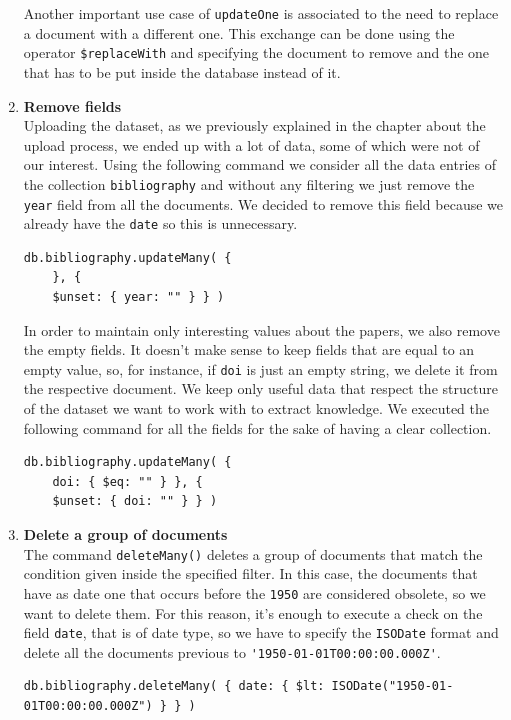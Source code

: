 \begin{enumerate}
    Another important use case of \verb|updateOne| is associated to the need to replace a document with a different one.
    This exchange can be done using the operator \verb|$replaceWith| and specifying the document to remove and the one that has to be put inside the database instead of it.
    \item \textbf{Remove fields}\\
    Uploading the dataset, as we previously explained in the chapter about the upload process, we ended up with a lot of data, some of which were not of our interest.
    Using the following command we consider all the data entries of the collection \verb|bibliography| and without any filtering we just remove the \verb|year| field from all the documents.
    We decided to remove this field because we already have the \verb|date| so this is unnecessary.
    \begin{lstlisting}[label={lst:lstlisting58}]
db.bibliography.updateMany( {
    }, {
    $unset: { year: "" } } )
    \end{lstlisting}
    In order to maintain only interesting values about the papers, we also remove the empty fields.
    It doesn't make sense to keep fields that are equal to an empty value, so, for instance, if \verb|doi| is just an empty string, we delete it from the respective document.
    We keep only useful data that respect the structure of the dataset we want to work with to extract knowledge.
    We executed the following command for all the fields for the sake of having a clear collection.
    \begin{lstlisting}[label={lst:lstlisting59}]
db.bibliography.updateMany( {
    doi: { $eq: "" } }, {
    $unset: { doi: "" } } )
    \end{lstlisting}
    \item \textbf{Delete a group of documents}\\
    The command \verb|deleteMany()| deletes a group of documents that match the condition given inside the specified filter.
    In this case, the documents that have as date one that occurs before the \verb|1950| are considered obsolete, so we want to delete them.
    For this reason, it's enough to execute a check on the field \verb|date|, that is of date type, so we have to specify the \verb|ISODate| format and delete all the documents previous to \verb|'1950-01-01T00:00:00.000Z'|.
    \begin{lstlisting}[label={lst:lstlisting60}]
db.bibliography.deleteMany( { date: { $lt: ISODate("1950-01-01T00:00:00.000Z") } } )

\end{lstlisting}
\end{enumerate}
